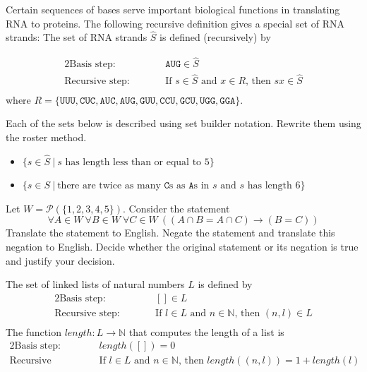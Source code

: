 \documentclass[12pt, oneside]{article}
\newcommand{\A}[0]{\texttt{A}}
\newcommand{\C}[0]{\texttt{C}}
\newcommand{\G}[0]{\texttt{G}}
\newcommand{\U}[0]{\texttt{U}}
\begin{document}
Certain 
 sequences of bases serve important biological functions in translating RNA to proteins. The following
 recursive definition gives a special set of RNA strands: The set of RNA strands $\hat{S}$ is defined (recursively)
 by 
 
 \begin{alignat*}{2}
\text{Basis step:} & & \A\U\G \in \hat{S}\\
\text{Recursive step:} & \qquad& \text{If } s \in \hat{S} \text{ and } x \in R \text{, then } sx\in \hat{S}\\
 \end{alignat*}
 where $R = \{ \U\U\U, \C\U\C, \A\U\C, \A\U\G, \G\U\U, \C\C\U, \G\C\U, \U\G\G, \G\G\A \}$.

Each of the sets below is described using set builder notation. Rewrite them using the roster method. 
\begin{itemize}
\item $\{s \in \hat{S} ~|~ s \text{ has length less than or equal to $5$} \}$ 

\vspace{50pt}


\item $\{s \in S ~|~ \text{there are twice as many $\C$s as $\A$s in $s$ and $s$ has length $6$} \}$ 

\vspace{50pt}

\end{itemize} \newpage


Let $W = \mathcal{P}( \{ 1,2,3,4,5\})$. Consider the statement 
\[
\forall A \in W~ \forall B \in W ~ \forall C \in W~ ((A \cap B = A \cap C) \to (B=C) )
\]
Translate the statement to English.
Negate the statement 
and translate this negation to English.
Decide whether the original statement or its negation is true
and justify your decision.
 \newpage


The set of linked lists of natural numbers $L$ is defined by 
 \begin{alignat*}{2}
\text{Basis step:} & &[] \in L \\
\text{Recursive step:} & \qquad& \text{If } l \in L \text{ and } n \in \mathbb{N} \text{, then } (n,l) \in L\\
 \end{alignat*}
 The function $length: L \to \mathbb{N}$ that computes the length of a list is
  \begin{alignat*}{2}
\text{Basis step:} & &length([]) = 0\\
\text{Recursive step:} & \qquad& \text{If $l \in L$ and $n \in \mathbb{N}$, then } length( ( n,l) ) = 1 + length(l)\\
 \end{alignat*}
\end{document}
